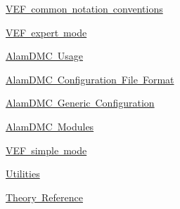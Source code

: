 
\begin{DoxyItemize}
\item \mbox{\hyperlink{page_conventions}{VEF common notation conventions}}
\item \mbox{\hyperlink{page_expert_mode}{VEF expert mode}}
\begin{DoxyItemize}
\item \mbox{\hyperlink{page_alamdmc_usage}{Alam\+DMC Usage}}
\item \mbox{\hyperlink{page_alamdmc_format}{Alam\+DMC Configuration File Format}}
\item \mbox{\hyperlink{page_alamdmc_generic}{Alam\+DMC Generic Configuration}}
\item \mbox{\hyperlink{page_alamdmc_modules}{Alam\+DMC Modules}}
\end{DoxyItemize}
\item \mbox{\hyperlink{page_simple_mode}{VEF simple mode}}
\item \mbox{\hyperlink{page_utilities}{Utilities}}
\item \mbox{\hyperlink{page_theory}{Theory Reference}} 
\end{DoxyItemize}